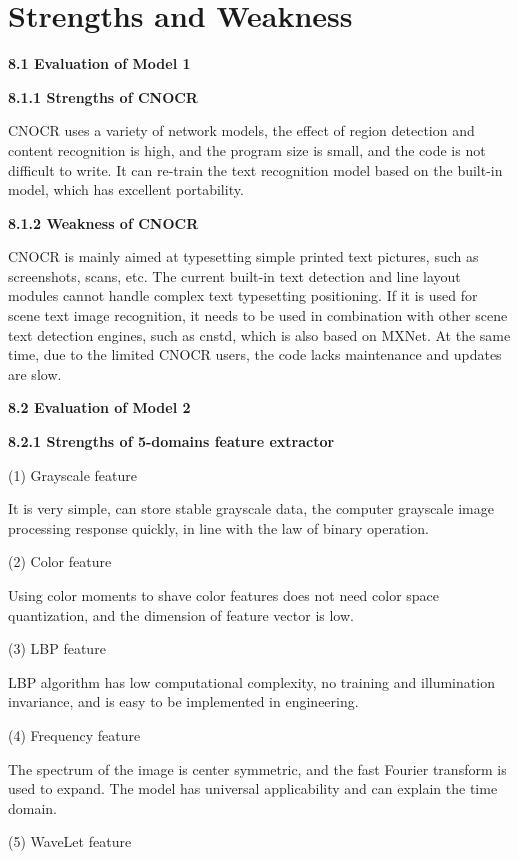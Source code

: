 \documentclass{apmcmthesis}
\begin{document}
	

\section{Strengths and Weakness}

\noindent\textbf{8.1 Evaluation of Model 1}

\noindent\textbf{8.1.1 Strengths of CNOCR}

CNOCR uses a variety of network models, the effect of region detection and content recognition is high, and the program size is small, and the code is not difficult to write. It can re-train the text recognition model based on the built-in model, which has excellent portability.

\noindent\textbf{8.1.2 Weakness of CNOCR}

CNOCR is mainly aimed at typesetting simple printed text pictures, such as screenshots, scans, etc. The current built-in text detection and line layout modules cannot handle complex text typesetting positioning. If it is used for scene text image recognition, it needs to be used in combination with other scene text detection engines, such as cnstd, which is also based on MXNet. At the same time, due to the limited CNOCR users, the code lacks maintenance and updates are slow.

\noindent\textbf{8.2 Evaluation of Model 2}

\noindent\textbf{8.2.1 Strengths of 5-domains feature extractor}

\noindent(1) Grayscale feature 

It is very simple, can store stable grayscale data, the computer grayscale image processing response quickly, in line with the law of binary operation.

\noindent(2) Color feature 

Using color moments to shave color features does not need color space quantization, and the dimension of feature vector is low.

\noindent(3) LBP feature 

LBP algorithm has low computational complexity, no training and illumination invariance, and is easy to be implemented in engineering.

\noindent(4) Frequency feature 

The spectrum of the image is center symmetric, and the fast Fourier transform is used to expand. The model has universal applicability and can explain the time domain.

\noindent(5) WaveLet feature 
\end{document}
